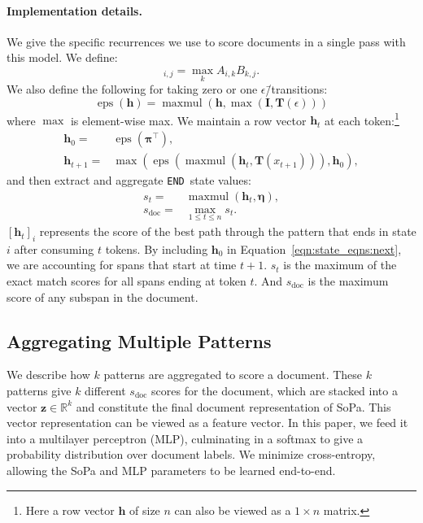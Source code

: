 \documentclass[11pt,a4paper]{article}
\newcommand{\isubsection}[2]{\subsection{#1}\label{ssec:#2}}
\newcommand{\SoftP}{SoPa\xspace}
\newcommand{\EndState}{\texttt{END}}
\newcommand{\epstrans}{$\epsilon$\=/transition} %
\newcommand{\tensor}[1]{\mathbf{#1}}
\newcommand{\R}{\mathbb{R}}
\DeclareMathOperator{\maxmul}{maxmul}
\DeclareMathOperator{\eps}{eps}
\begin{document}
\paragraph{Implementation details.}
We give the specific recurrences we use to score documents in a single pass with this model.
We define:
\begin{equation}
[\maxmul(\tensor{A}, \tensor{B})]_{i,j} =
  \max_{k}{
    A_{i,k} B_{k,j}
  }.
\end{equation}
We also define the following for taking zero or one \epstrans s:
\begin{equation}
\eps{(\tensor{h})} =
  \maxmul{\left(
    \tensor{h},
    \max(\tensor{I}, \tensor{T}(\epsilon))
  \right)}
\end{equation}
where $\max$ is element-wise max.
We maintain a row vector $\tensor{h}_t$ at each token:\footnote{%
Here a row vector $\tensor{h}$ of size $n$ can also be viewed as a $1 \times n$ matrix.}
\begin{subequations}
\begin{align}
\label{eqn:state_eqns:start}
\tensor{h}_0 = &
  \eps(\tensor{\pi^\top}), \\
\label{eqn:state_eqns:next}
\tensor{h}_{t+1} = &
  \max{\left(
    \eps(\maxmul{(\tensor{h}_t, \tensor{T}(x_{t+1}))}),
    \tensor{h}_0
  \right)},
\end{align}
\end{subequations}
and then extract and aggregate \EndState\ state values:
\begin{subequations}
\begin{align}
\label{eqn:state_eqns:score_t}
s_t = &
  \maxmul{(\tensor{h}_t, \tensor{\eta})}, \\
\label{eqn:state_eqns:score_sum}
s_{\text{doc}} = &
  \max_{1 \leq t \leq n}{s_t}.
\end{align}
\end{subequations}
$[\tensor{h}_t]_i$ represents the score of the best path through the pattern that ends in state $i$ after consuming $t$ tokens.
By including $\tensor{h}_0$ in Equation~\ref{eqn:state_eqns:next}, we are accounting for spans that start at time $t+1$.
$s_t$ is the maximum of the exact match scores for all spans ending at token $t$.
And $s_{\text{doc}}$ is the maximum score of any subspan in the document.

\isubsection{Aggregating Multiple Patterns}{soft-patterns:classifying}

We describe how $k$ patterns are aggregated to score a document.
These $k$ patterns give $k$ different $s_{\text{doc}}$ scores for the document,
which are stacked into a vector $\tensor{z} \in \R^k$ and constitute the final document representation of \SoftP. 
This vector representation can be viewed as a feature vector.
In this paper, we feed it into a multilayer perceptron (MLP), culminating in a softmax to give a probability distribution over document labels.
We minimize cross-entropy, allowing the \SoftP and MLP parameters to be learned end-to-end.
\end{document}
